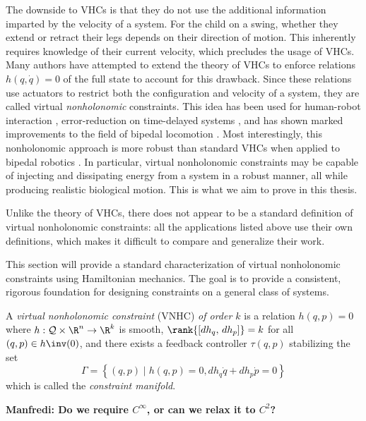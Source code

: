 The downside to VHCs is that they do not use the additional information imparted
by the velocity of a system.
For the child on a swing, whether they extend or retract their legs
depends on their direction of motion. 
This inherently requires knowledge of their current velocity, which precludes
the usage of VHCs. 
Many authors have attempted to extend the theory of VHCs to enforce relations
\(h(q,\dot{q}) = 0\) of the full state to account for this drawback. 
Since these relations use actuators to restrict both the configuration and
velocity of a system, they are called virtual \textit{nonholonomic} constraints.
This idea has been used for human-robot interaction
\cite{vnhc_human_robot_cooperation,psd_based_vnhc_redundant_manipulator,haptic_vnhc},
error-reduction on time-delayed systems \cite{vnhc_time_delay_teleop},
and has shown marked improvements to the field of bipedal locomotion 
\cite{nhvc_dynamic_walking,
hybrid_zero_dynamics_bipedal_nhvcs,output_nhvc_bipedal_control}.
Most interestingly, this nonholonomic approach is more robust
than standard VHCs when applied to bipedal robotics \cite{nhvc_incline_walking}.
In particular, virtual nonholonomic constraints may be capable of injecting and
dissipating energy from a system in a robust manner, all while producing
realistic biological motion. This is what we aim to prove in this thesis.

Unlike the theory of VHCs, there does not appear to be a standard definition of
virtual nonholonomic constraints: 
all the applications listed above use their own definitions, which makes it
difficult to compare and generalize their work. 

This section will provide a standard characterization of virtual nonholonomic
constraints using Hamiltonian mechanics. 
The goal is to provide a consistent, rigorous foundation for designing
constraints on a general class of systems.

\begin{defn}
    A \textit{virtual nonholonomic constraint} (VNHC) \textit{of order \(k\)} is a
    relation \(h(q,p) = 0\) where \(h : \mathcal{Q}\times\R^n \rightarrow \R^k\) is
    smooth, \(\rank{\left[ dh_q,\, dh_p \right]} = k\) for all 
    \((q,p) \in h\inv(0)\), and there exists a feedback controller \(\tau(q,p)\)
    stabilizing the set
    \[
        \Gamma = \left\{(q,p) \mid h(q,p) = 0, dh_q \dot{q} + dh_p \dot{p} = 0\right\}
    \]
    which is called the \textit{constraint manifold}.
\end{defn}
\textbf{Manfredi: Do we require \(C^\infty\), or can we relax it to \(C^2\)?}

